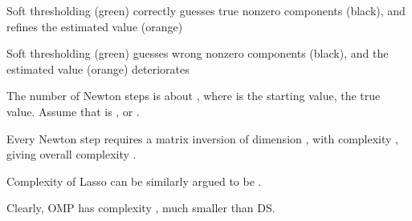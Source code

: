 {
\blank [big]

\I Soft thresholding (green) correctly guesses true nonzero components (black), and refines the estimated value (orange)
}
{
\blank [big]

\I Soft thresholding (green) guesses wrong nonzero components (black), and the estimated value (orange) deteriorates
}
{
\I The number of Newton steps is about , where  is the starting value,  the true value.
Assume that is , or .

\I Every Newton step requires a matrix inversion of dimension , with complexity , giving overall complexity .

\I Complexity of Lasso can be similarly argued to be .

\I Clearly, OMP has complexity , much smaller than DS.
}


